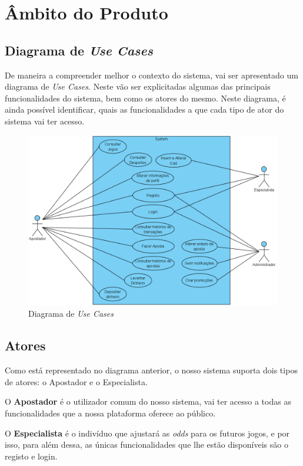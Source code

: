 \chapter{Âmbito do Produto}
\section{Diagrama de \textit{Use Cases}}
De maneira a compreender melhor o contexto do sistema, vai ser apresentado um diagrama de \textit{Use Cases}. Neste vão ser explicitadas algumas das principais funcionalidades do sistema, bem como os atores do mesmo.
Neste diagrama, é ainda possível identificar, quais as funcionalidades a que cada tipo de ator do sistema vai ter acesso.

\begin{figure}[H]
\centering
\includegraphics[width=1\textwidth]{imagens/ambitoProduto/Casos_de_uso_NEW.png}
\caption{Diagrama de \textit{Use Cases}}
\end{figure}
\newpage
\section{Atores}
Como está representado no diagrama anterior, o nosso sistema suporta dois tipos de atores: o Apostador e o Especialista. 
\par
O \textbf{Apostador} é o utilizador comum do nosso sistema, vai ter acesso a todas as funcionalidades que a nossa plataforma oferece ao público. 
\par 
O \textbf{Especialista} é o indivíduo que ajustará as \textit{odds} para os futuros jogos, e por isso, para além dessa, as únicas funcionalidades que lhe estão disponíveis são o registo e login.

